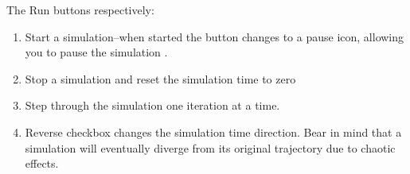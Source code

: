 \label{RunButtons}


The Run buttons respectively: 
\begin{enumerate}
\item Start a simulation--when started the button changes to a pause icon,
allowing you to pause the simulation . 
\item Stop a simulation and reset the simulation time to zero 
\item Step through the simulation one iteration at a time. 
\item Reverse checkbox changes the simulation time direction. Bear in mind
that a simulation will eventually diverge from its original trajectory
due to chaotic effects. 
\end{enumerate}

